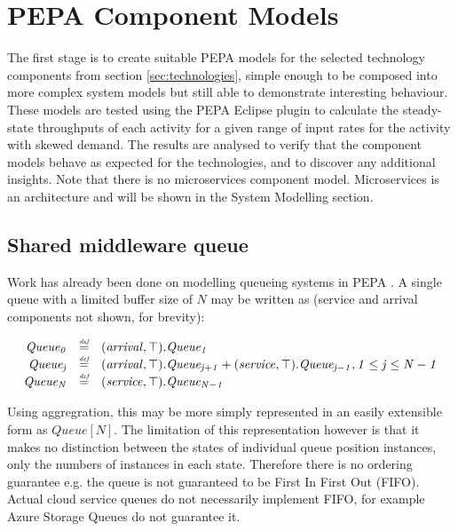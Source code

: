 %
%

\section{PEPA Component Models}\label{sec:pepa-component-models}

The first stage is to create suitable PEPA models for the selected technology components from section \ref{sec:technologies}, simple enough to be composed into more complex system models but still able to demonstrate interesting behaviour.  These models are tested using the PEPA Eclipse plugin \cite{RN1080} to calculate the steady-state throughputs of each activity for a given range of input rates for the activity with skewed demand.  The results are analysed to verify that the component models behave as expected for the technologies, and to discover any additional insights.  Note that there is no microservices component model.  Microservices is an architecture and will be shown in the System Modelling section.

%
%
\FloatBarrier
\subsection{Shared middleware queue}

Work has already been done on modelling queueing systems in PEPA \cite{RN75}.  A single queue with a limited buffer size of $\mathit{N}$ may be written as (service and arrival components not shown, for brevity):

\begin{center}
\begin{displaymath}
\begin{array}{rcl}
\mathit{Queue_0} & \stackrel{\mbox{\em {\tiny def}}}{=} & (\mathit{arrival},\mathit{\top}).\mathit{Queue_1}\\
\mathit{Queue_j} & \stackrel{\mbox{\em {\tiny def}}}{=} & (\mathit{arrival},\mathit{\top}).\mathit{Queue_{j+1}} + (\mathit{service},\mathit{\top}).\mathit{Queue_{j-1}}, \mathit{1 \le j \le N-1}\\
\mathit{Queue_N} & \stackrel{\mbox{\em {\tiny def}}}{=} & (\mathit{service},\mathit{\top}).\mathit{Queue_{N-1}}\\
\end{array}
\end{displaymath}
\end{center}

Using aggregration, this may be more simply represented in an easily extensible form as $\mathit{Queue[N]}$.  The limitation of this representation however is that it makes no distinction between the states of individual queue position instances, only the numbers of instances in each state.  Therefore there is no ordering guarantee e.g. the queue is not guaranteed to be First In First Out (FIFO).  Actual cloud service queues do not necessarily implement FIFO, for example Azure Storage Queues \cite{RN1072} do not guarantee it.


